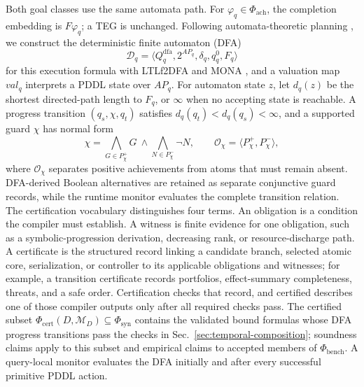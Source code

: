Both goal classes use the same automata path. For
$\varphi_q\in\Phi_{\mathrm{ach}}$, the completion embedding is $F\varphi_q$; a
TEG is unchanged. Following automata-theoretic planning
\cite{DeGiacomoRubin2018AutomataFOND}, we construct the deterministic finite
automaton (DFA)
\[
\mathcal D_q=\langle Q_q^{\mathrm{dfa}},2^{AP_q},\delta_q,q_q^0,F_q\rangle
\]
for this execution formula
with LTLf2DFA and MONA \cite{Fuggitti2020LTLf2DFA,Henriksen1995MONA}, and a
valuation map $\mathit{val}_q$ interprets a PDDL state over $AP_q$. For
automaton state $z$, let $d_q(z)$ be the shortest directed-path length to
$F_q$, or $\infty$ when no accepting state is reachable. A progress transition
$(q_s,\chi,q_t)$ satisfies $d_q(q_t)<d_q(q_s)<\infty$, and a supported guard
$\chi$ has normal form
\[
\chi=
\bigwedge_{G\in P_\chi^+}G\ \land\!
\bigwedge_{N\in P_\chi^-}\neg N,
\qquad
\mathcal O_\chi=\langle P_\chi^+,P_\chi^-\rangle,
\]
where $\mathcal O_\chi$ separates positive achievements from atoms that must
remain absent. DFA-derived Boolean alternatives
are retained as separate conjunctive guard records, while the runtime monitor
evaluates the complete transition relation. The certification vocabulary
distinguishes four terms.
An obligation is a condition the compiler must establish. A witness is finite
evidence for one obligation, such as a symbolic-progression derivation,
decreasing rank, or resource-discharge path. A certificate is the structured
record linking a candidate branch, selected atomic core, serialization, or
controller to its applicable obligations and witnesses;
for example, a transition certificate records portfolios, effect-summary
completeness, threats, and a safe order. Certification checks that record, and
certified describes one of those compiler outputs only after all required checks
pass. The certified subset
$\Phi_{\mathrm{cert}}(D,\mathcal M_D)\subseteq\Phi_{\mathrm{syn}}$ contains the
validated bound formulas whose DFA progress transitions pass the checks in
Sec.~\ref{sec:temporal-composition}; soundness claims apply to this subset and
empirical claims to accepted members of $\Phi_{\mathrm{bench}}$.
A query-local monitor evaluates the DFA initially and after every successful
primitive PDDL action.
